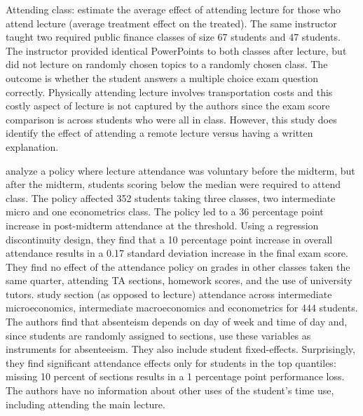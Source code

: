 \documentclass[12pt]{article}
\begin{document}
Attending class: \textcite{cl2008} estimate the average effect of attending lecture for those who attend lecture (average treatment effect on the treated). The same instructor taught two required public finance classes of size 67 students and 47 students.  The instructor provided identical PowerPoints to both classes after lecture, but did not lecture on randomly chosen topics to a randomly chosen class.  The outcome is whether the student answers a multiple choice exam question correctly.  Physically attending lecture involves transportation costs and this costly aspect of lecture is not captured by the authors since the exam score comparison is across students who were all in class.  However, this study does identify the effect of attending a remote lecture versus having a written explanation.  

\textcite{dgm2010} analyze a policy where lecture attendance was voluntary before the midterm, but after the midterm, students scoring below the median were required to attend class. The policy affected 352 students taking three classes, two intermediate micro and one econometrics class. The policy led to a 36 percentage point increase in post-midterm attendance at the threshold. Using a regression discontinuity design, they find that a 10 percentage point increase in overall attendance results in a 0.17 standard deviation increase in the final exam score. They find no effect of the attendance policy on grades in other classes taken the same quarter, attending TA sections, homework scores, and the use of university tutors.
\textcite{ans2012} study section (as opposed to lecture) attendance across intermediate microeconomics, intermediate macroeconomics and econometrics for 444 students. The authors find that absenteism depends on day of week and time of day and, since students are randomly assigned to sections, use these variables as instruments for absenteeism. They also include student fixed-effects. Surprisingly, they find significant attendance effects only for students in the top quantiles: missing 10 percent of sections results in a 1 percentage point performance loss. The authors have no information about other uses of the student's time use, including attending the main lecture.
\end{document}
